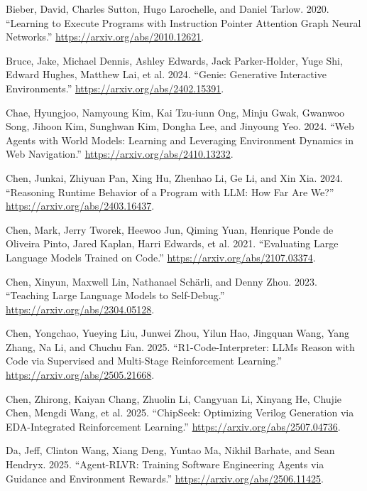 \documentclass{article}
\newlength{\cslhangindent}
\newenvironment{CSLReferences}[2]
 {%
  \setlength{\parindent}{0pt}
  \everypar{\setlength{\hangindent}{\cslhangindent}}\ignorespaces
 }
 {\par}
\begin{document}
\begin{CSLReferences}{1}{0}
\leavevmode{}%
Bieber, David, Charles Sutton, Hugo Larochelle, and Daniel Tarlow. 2020.
{``Learning to Execute Programs with Instruction Pointer Attention Graph
Neural Networks.''} \url{https://arxiv.org/abs/2010.12621}.

\leavevmode{}%
Bruce, Jake, Michael Dennis, Ashley Edwards, Jack Parker-Holder, Yuge
Shi, Edward Hughes, Matthew Lai, et al. 2024. {``Genie: Generative
Interactive Environments.''} \url{https://arxiv.org/abs/2402.15391}.

\leavevmode{}%
Chae, Hyungjoo, Namyoung Kim, Kai Tzu-iunn Ong, Minju Gwak, Gwanwoo
Song, Jihoon Kim, Sunghwan Kim, Dongha Lee, and Jinyoung Yeo. 2024.
{``Web Agents with World Models: Learning and Leveraging Environment
Dynamics in Web Navigation.''} \url{https://arxiv.org/abs/2410.13232}.

\leavevmode{}%
Chen, Junkai, Zhiyuan Pan, Xing Hu, Zhenhao Li, Ge Li, and Xin Xia.
2024. {``Reasoning Runtime Behavior of a Program with LLM: How Far Are
We?''} \url{https://arxiv.org/abs/2403.16437}.

\leavevmode{}%
Chen, Mark, Jerry Tworek, Heewoo Jun, Qiming Yuan, Henrique Ponde de
Oliveira Pinto, Jared Kaplan, Harri Edwards, et al. 2021. {``Evaluating
Large Language Models Trained on Code.''}
\url{https://arxiv.org/abs/2107.03374}.

\leavevmode{}%
Chen, Xinyun, Maxwell Lin, Nathanael Schärli, and Denny Zhou. 2023.
{``Teaching Large Language Models to Self-Debug.''}
\url{https://arxiv.org/abs/2304.05128}.

\leavevmode{}%
Chen, Yongchao, Yueying Liu, Junwei Zhou, Yilun Hao, Jingquan Wang, Yang
Zhang, Na Li, and Chuchu Fan. 2025. {``R1-Code-Interpreter: LLMs Reason
with Code via Supervised and Multi-Stage Reinforcement Learning.''}
\url{https://arxiv.org/abs/2505.21668}.

\leavevmode{}%
Chen, Zhirong, Kaiyan Chang, Zhuolin Li, Cangyuan Li, Xinyang He, Chujie
Chen, Mengdi Wang, et al. 2025. {``ChipSeek: Optimizing Verilog
Generation via EDA-Integrated Reinforcement Learning.''}
\url{https://arxiv.org/abs/2507.04736}.

\leavevmode{}%
Da, Jeff, Clinton Wang, Xiang Deng, Yuntao Ma, Nikhil Barhate, and Sean
Hendryx. 2025. {``Agent-RLVR: Training Software Engineering Agents via
Guidance and Environment Rewards.''}
\url{https://arxiv.org/abs/2506.11425}.


\end{CSLReferences}
\end{document}

